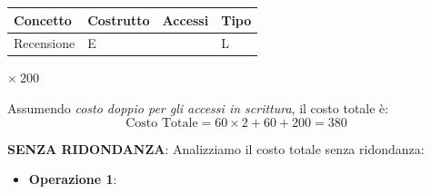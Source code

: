 \documentclass[10pt,twoside]{article}
\begin{document}
{{\begin{itemize}
            \noindent
            \begin{minipage}[t]{0.7\textwidth}
                \vspace{0pt}
                \begin{tabular}{|>{\centering\arraybackslash}p{2.6cm}|
                                >{\centering\arraybackslash}p{2cm}|
                                >{\centering\arraybackslash}p{3cm}|
                                >{\centering\arraybackslash}p{2cm}|}
                    \hline
                    \rowcolor{lightgray!40}
                    \textbf{Concetto} & \textbf{Costrutto} & \textbf{Accessi} & \textbf{Tipo} \\
                    \hline
                    \rowcolor{white!40}
                    Recensione & E & 1 & L \\
                    \hline
                \end{tabular}
            \end{minipage}%
            \begin{minipage}[t]{0.2\textwidth}
                \vspace{3.5ex}
                \begin{flushleft}
                    $\times\ 200$
                \end{flushleft}
            \end{minipage}
        \end{itemize}
        
        \vspace{1em}
        
        Assumendo \textit{costo doppio per gli accessi in scrittura}, il costo totale è:
        \[
            \text{Costo Totale} = 60 \times 2 + 60 + 200 = \boxed{380}
        \]
        
        \textbf{SENZA RIDONDANZA}: Analizziamo il costo totale senza ridondanza:
        \begin{itemize}
            \item \textbf{Operazione 1}:
        

\end{itemize}}}
\end{document}
